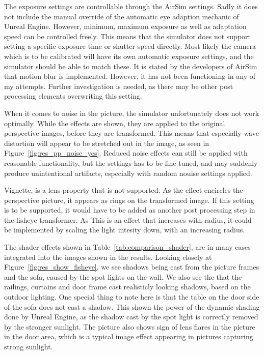 The exposure settings are controllable through the AirSim settings. Sadly it does not include the manual override of the automatic eye adaption mechanic of Unreal Engine. However, minimum, maximum exposure as well as adaptation speed can be controlled freely. This means that the simulator does not support setting a specific exposure time or shutter speed directly. Most likely the camera which is to be calibrated will have its own automatic exposure settings, and the simulator should be able to match these. It is stated by the developers of AirSim that motion blur is implemented. However, it has not been functioning in any of my attempts. Further investigation is needed, as there may be other post processing elements overwriting this setting.

When it comes to noise in the picture, the simulator unfortunately does not work optimally. While the effects are shown, they are applied to the original perspective images, before they are transformed. This means that especially wave distortion will appear to be stretched out in the image, as seen in Figure~\ref{fig:res_pp_noise_yes}. Reduced noise effects can still be applied with reasonable functionality, but the settings has to be fine tuned, and may suddenly produce unintentional artifacts, especially with random nouise settings applied.

Vignette, is a lens property that is not supported. As the effect encircles the perspective picture, it appears as rings on the transformed image. If this setting is to be supported, it would have to be added as another post processing step in the fisheye transformer. As This is an effect that increases with radius, it could be implemented by scaling the light intesity down, with an increasing radius.

The shader effects shown in Table~\ref{tab:comparison_shader}, are in many cases integrated into the images shown in the results. Looking closely at Figure~\ref{fig:res_show_fisheye}, we see shadows being cast from the picture frames and the sofa, caused by the spot lights on the wall. We also see the that the railings, curtains and door frame cast realisticly looking shadows, based on the outdoor lighting. One special thing to note here is that the table on the door side of the sofa does not cast a shadow. This shown the power of the dynamic shading done by Unreal Engine, as the shadow cast by the spot light is correctly removed by the stronger sunlight. The picture also shows sign of lens flares in the picture in the door area, which is a typical image effect appearing in pictures capturing strong sunlight.

